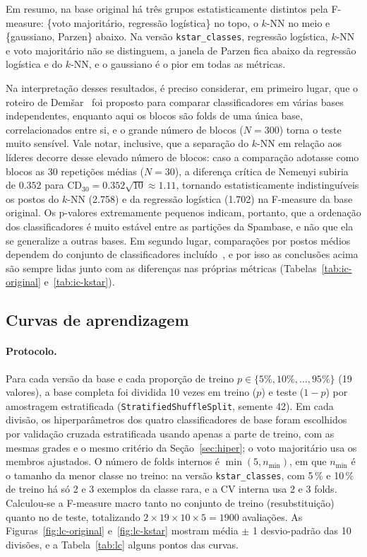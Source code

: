 \documentclass[11pt,a4paper]{article}
\begin{document}
Em resumo, na base original há três grupos estatisticamente distintos pela F-measure: \{voto majoritário,
regressão logística\} no topo, o $k$-NN no meio e \{gaussiano, Parzen\} abaixo. Na versão \texttt{kstar\_classes},
regressão logística, $k$-NN e voto majoritário não se distinguem, a janela de Parzen fica abaixo da regressão
logística e do $k$-NN, e o gaussiano é o pior em todas as métricas.

Na interpretação desses resultados, é preciso considerar, em primeiro lugar, que o roteiro de Demšar~\cite{demsar2006statistical} foi proposto para 
comparar classificadores em várias bases independentes, enquanto aqui os blocos são folds de uma única base, correlacionados entre si, e o grande número 
de blocos ($N=300$) torna o teste muito sensível. Vale notar, inclusive, que a separação do $k$-NN em relação aos líderes decorre desse elevado número 
de blocos: caso a comparação adotasse como blocos as 30 repetições médias ($N=30$), a diferença crítica de Nemenyi subiria de $\num{0.352}$ para 
$\mathrm{CD}_{30}=\num{0.352}\sqrt{10}\approx\num{1.11}$, tornando estatisticamente indistinguíveis os postos do $k$-NN (\num{2.758}) e da regressão 
logística (\num{1.702}) na F-measure da base original. Os p-valores extremamente pequenos indicam, portanto, que a ordenação dos classificadores é muito 
estável entre as partições da Spambase, e não que ela se generalize a outras bases. Em segundo lugar, comparações por postos médios dependem do 
conjunto de classificadores incluído~\cite{benavoli2016posthoc}, e por isso as conclusões acima são sempre lidas junto com as diferenças nas
próprias métricas (Tabelas~\ref{tab:ic-original} e~\ref{tab:ic-kstar}).

\subsection{Curvas de aprendizagem}\label{sec:curvas}

\paragraph{Protocolo.} Para cada versão da base e cada proporção de treino $p\in\{5\%,10\%,\dots,95\%\}$ (19
valores), a base completa foi dividida 10 vezes em treino ($p$) e teste ($1-p$) por amostragem estratificada
(\texttt{StratifiedShuffleSplit}, semente 42). Em cada divisão, os hiperparâmetros dos quatro classificadores
de base foram escolhidos por validação cruzada estratificada usando apenas a parte de treino, com as mesmas grades
e o mesmo critério da Seção~\ref{sec:hiper}; o voto majoritário usa os membros ajustados. O número de folds
internos é $\min(5,n_{\min})$, em que $n_{\min}$ é o tamanho da menor classe no treino: na versão
\texttt{kstar\_classes}, com 5\,\% e 10\,\% de treino há só 2 e 3 exemplos da classe rara, e a CV interna usa 2 e 3
folds. Calculou-se a F-measure macro tanto no conjunto de treino (resubstituição) quanto no de teste, totalizando
$2\times19\times10\times5=\num{1900}$ avaliações. As Figuras~\ref{fig:lc-original} e~\ref{fig:lc-kstar} mostram
média $\pm$ 1 desvio-padrão das 10 divisões, e a Tabela~\ref{tab:lc} alguns pontos das curvas.
\end{document}
